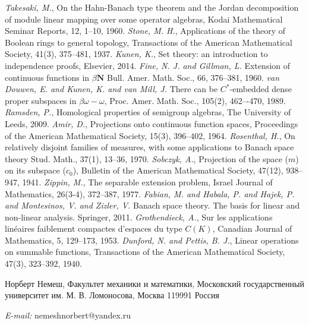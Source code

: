 \documentclass[12pt]{article}
\begin{document}
\begin{thebibliography}{999}
    \textit{Takesaki, M.},
    On the Hahn-Banach type theorem and the Jordan decomposition of module linear mapping over some operator algebras,
    Kodai Mathematical Seminar Reports,
    12,
    1--10,
    1960.
    \textit{Stone, M. H.},
    Applications of the theory of Boolean rings to general topology,
    Transactions of the American Mathematical Society,
    41(3),
    375--481,
    1937.
    \textit{Kunen, K.},
    Set theory: an introduction to independence proofs,
    Elsevier,
    2014.
    \textit{Fine, N. J. and Gillman, L.}
    Extension of continuous functions in $\beta {\mathbf{N}}$
    Bull. Amer. Math. Soc.,
    66,
    376--381,
    1960.
    \textit{van Douwen, E. and  Kunen,  K. and van Mill, J.}
    There can be $C^*$-embedded dense proper subspaces in $\beta\omega-\omega$,
    Proc. Amer. Math. Soc.,
    105(2),
    462–-470,
    1989.
    \textit{Ramsden, P.},
    Homological properties of semigroup algebras,
    The University of Leeds,
    2009.
    \textit{Amir, D.},
    Projections onto continuous function spaces,
    Proceedings of the American Mathematical Society,
    15(3),
    396--402,
    1964.
    \textit{Rosenthal, H.},
    On relatively disjoint families of measures, with some applications to Banach space theory
    Stud. Math.,
    37(1),
    13--36,
    1970.
    \textit{Sobczyk, A.},
    Projection of the space ($m$) on its subspace ($c_0$),
    Bulletin of the American Mathematical Society,
    47(12),
    938--947,
    1941.
    \textit{Zippin, M.},
    The separable extension problem,
    Israel Journal of Mathematics,
    26(3-4),
    372--387,
    1977.
    \textit{Fabian, M. and Habala, P. and Hajek, P. and Montesinos, V. and Zizler, V.}
    Banach space theory. The basis for linear and non-linear analysis.
    Springer,
    2011.
    \textit{{Grothendieck, A.}},
    Sur les applications lin{\'e}aires faiblement compactes d'espaces du type $C(K)$,
    Canadian Journal of Mathematics,
    5,
    129--173,
    1953.
    \textit{Dunford, N. and Pettis, B. J.},
    Linear operations on summable functions,
    Transactions of the American Mathematical Society,
    47(3),
    323--392,
    1940.
\end{thebibliography}

Норберт Немеш, Факультет механики и математики, Московский государственный университет им. М. В. Ломоносова, Москва 119991 Россия

\textit{E-mail:} nemeshnorbert@yandex.ru
\end{document}
